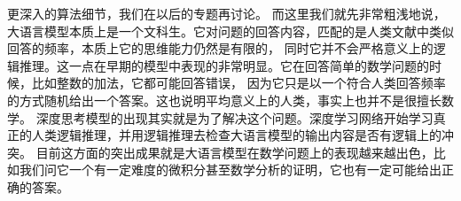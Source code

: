 \documentclass{ctexbook}
\numberwithin{theorem}{chapter}
\begin{document}
更深入的算法细节，我们在以后的专题再讨论。
而这里我们就先非常粗浅地说，大语言模型本质上是一个文科生。它对问题的回答内容，匹配的是人类文献中类似回答的频率，本质上它的思维能力仍然是有限的，
同时它并不会严格意义上的逻辑推理。这一点在早期的模型中表现的非常明显。它在回答简单的数学问题的时候，比如整数的加法，它都可能回答错误，
因为它只是以一个符合人类回答频率的方式随机给出一个答案。这也说明平均意义上的人类，事实上也并不是很擅长数学。
深度思考模型的出现其实就是为了解决这个问题。深度学习网络开始学习真正的人类逻辑推理，并用逻辑推理去检查大语言模型的输出内容是否有逻辑上的冲突。
目前这方面的突出成果就是大语言模型在数学问题上的表现越来越出色，比如我们问它一个有一定难度的微积分甚至数学分析的证明，它也有一定可能给出正确的答案。




\end{document}
